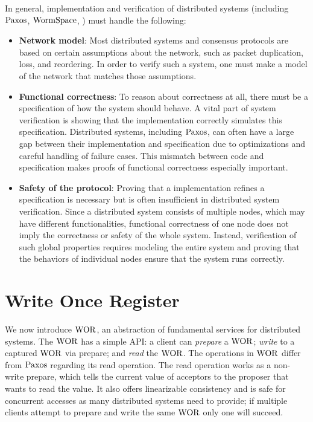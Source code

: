 In general, implementation and verification of distributed systems
(including $\mathrm{Paxos}$, $\mathrm{WormSpace}$, \etc) must handle the following:
\begin{itemize}

\item \textbf{Network model}:
Most distributed systems and consensus protocols are based on certain assumptions about the network,
such as packet duplication, loss, and reordering. In order to verify such a system, one must make a model of the network that matches
those assumptions.

\item \textbf{Functional correctness}: 
To reason about correctness at all, there must be a specification of how the system should behave.
A vital part of  system verification is showing that the implementation correctly simulates this specification.
Distributed systems, including $\mathrm{Paxos}$, can often have a large gap between their implementation and specification due to optimizations and careful handling of failure cases.
This mismatch between code and specification makes proofs of functional correctness especially important.

\item \textbf{Safety of the protocol}: 
Proving that a implementation refines a specification is necessary but is often insufficient in distributed system verification.
Since a distributed system consists of multiple nodes, which may have different functionalities,
functional correctness of one node does not imply the correctness or safety of the whole system.
Instead, verification of such global properties requires modeling the entire system and
proving that the behaviors of individual nodes ensure that the system runs correctly.
\end{itemize}

\section{Write Once Register}
\label{chapter:wormspace:sec:write-once-register}

We now introduce $\mathrm{WOR}$, an abstraction of fundamental services for distributed systems. 
The $\mathrm{WOR}$ has a simple API: a client can \textit{prepare} a $\mathrm{WOR}$; \textit{write} to a captured $\mathrm{WOR}$ via prepare; and \textit{read} the  $\mathrm{WOR}$. 
The operations in $\mathrm{WOR}$ differ from $\mathrm{Paxos}$ regarding its read operation. 
The read operation works as a non-write prepare, which tells the current value of acceptors to the proposer that wants to read the value.
It also offers linearizable consistency and is safe for concurrent accesses as many distributed systems need to provide; 
if multiple clients attempt to prepare and write the same $\mathrm{WOR}$ only one will succeed.

